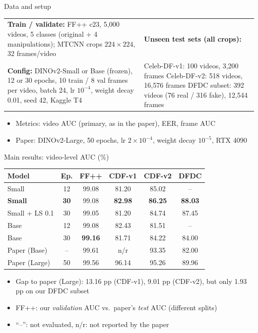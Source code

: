 \documentclass[aspectratio=169,10pt]{beamer}
\begin{document}
\begin{frame}{Data and setup}
\small
\begin{tabular}{@{}p{}p{}@{}}
\textbf{Train / validate:} FF++ c23, 5{,}000 videos, 5 classes (original + 4 manipulations); MTCNN crops $224\times224$, 32 frames/video &
\textbf{Unseen test sets (all crops):}\\
\textbf{Config:} DINOv2-Small or Base (frozen), 12 or 30 epochs, 10 train / 8 val frames per video, batch 24, lr $10^{-4}$, weight decay 0.01, seed 42, Kaggle T4 &
Celeb-DF-v1: 100 videos, 3{,}200 frames\newline
Celeb-DF-v2: 518 videos, 16{,}576 frames\newline
DFDC subset: 392 videos (76 real / 316 fake), 12{,}544 frames\\
\end{tabular}
\vspace{4pt}
\begin{itemize}
\item Metrics: video AUC (primary, as in the paper), EER, frame AUC
\item Paper: DINOv2-Large, 50 epochs, lr $2\times10^{-4}$, weight decay $10^{-5}$, RTX 4090
\end{itemize}
\end{frame}

\begin{frame}{Main results: video-level AUC (\%)}
\centering
\footnotesize
\begin{tabular}{|l|c||c|c|c|c|}
\hline
Model & Ep. & FF++ & CDF-v1 & CDF-v2 & DFDC\\\hline
Small & 12 & 99.08 & 81.20 & 85.02 & --\\
\textbf{Small} & \textbf{30} & 99.08 & \textbf{82.98} & \textbf{86.25} & \textbf{88.03}\\
Small + LS 0.1 & 30 & 99.05 & 81.20 & 84.74 & 87.45\\
Base & 12 & 99.08 & 82.43 & 81.51 & --\\
Base & 30 & \textbf{99.16} & 81.71 & 84.22 & 84.00\\\hline
Paper (Base) & -- & 99.61 & n/r & 93.35 & 82.00\\
Paper (Large) & 50 & 99.56 & 96.14 & 95.26 & 89.96\\\hline
\end{tabular}
\vspace{6pt}
\begin{itemize}
\item Gap to paper (Large): 13.16 pp (CDF-v1), 9.01 pp (CDF-v2), but only 1.93 pp on our DFDC subset
\item FF++: our \emph{validation} AUC vs.\ paper's \emph{test} AUC (different splits)
\item ``--'': not evaluated, n/r: not reported by the paper
\end{itemize}
\end{frame}
\end{document}
